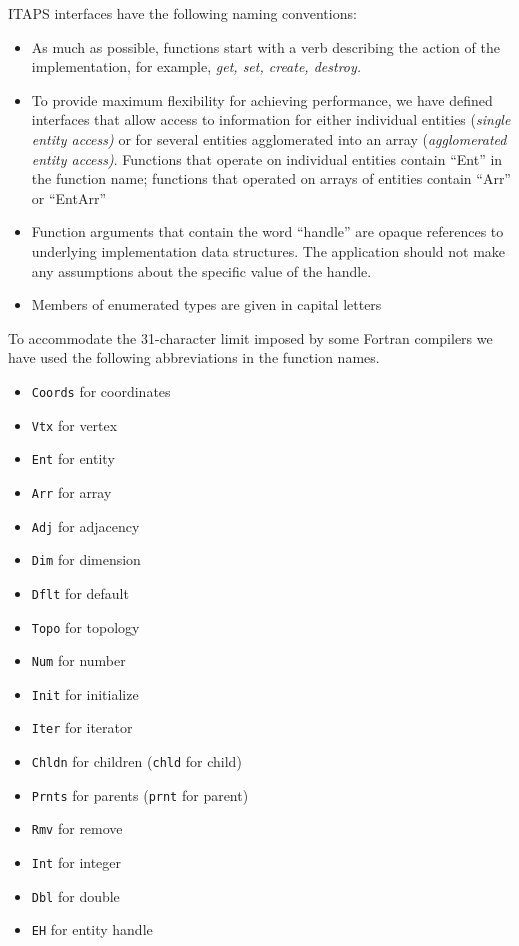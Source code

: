 \documentclass{article}
\begin{document}
ITAPS interfaces have the following naming conventions:
\begin{itemize}
\item As much as possible, functions start with a verb describing the 
action of the implementation, for example, \emph{get, set, create, 
destroy.}
\item To provide maximum flexibility for achieving performance, 
we have defined interfaces that allow access to information for 
either individual entities (\emph{single entity access)} or for 
several entities agglomerated into an array (\emph{agglomerated 
entity access)}. Functions that operate on individual entities 
contain ``Ent'' in the function name; functions that operated 
on arrays of entities contain ``Arr'' or ``EntArr''
\item Function arguments that contain the word ``handle'' 
are opaque references to underlying implementation data structures. 
The application should not make any assumptions about the specific 
value of the handle.
\item Members of enumerated types are given in capital letters

\end{itemize}

To accommodate the 31-character limit imposed by some Fortran 
compilers we have used the following abbreviations in the function 
names.
\begin{itemize}
\item {\tt Coords} for coordinates
\item {\tt Vtx} for vertex
\item {\tt Ent} for entity
\item {\tt Arr} for array
\item {\tt Adj} for adjacency
\item {\tt Dim} for dimension
\item {\tt Dflt} for default
\item {\tt Topo} for topology
\item {\tt Num} for number
\item {\tt Init} for initialize
\item {\tt Iter} for iterator
\item {\tt Chldn} for children ({\tt chld} for child)
\item {\tt Prnts} for parents ({\tt prnt} for parent)
\item {\tt Rmv} for remove
\item {\tt Int} for integer
\item {\tt Dbl} for double
\item {\tt EH} for entity handle
\end{itemize}
\end{document}
